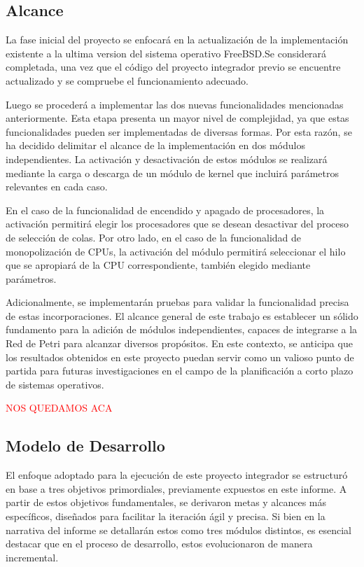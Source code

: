 \subsection{Alcance}

La fase inicial del proyecto se enfocará en la actualización de la implementación existente a la ultima version del sistema operativo FreeBSD.\@ Se considerará completada, una vez que el código del proyecto integrador previo se encuentre actualizado y se compruebe el funcionamiento adecuado.\par

Luego se procederá a implementar las dos nuevas funcionalidades mencionadas anteriormente. Esta etapa presenta un mayor nivel de complejidad, ya que estas funcionalidades pueden ser implementadas de diversas formas. Por esta razón, se ha decidido delimitar el alcance de la implementación en dos módulos independientes. La activación y desactivación de estos módulos se realizará mediante la carga o descarga de un módulo de kernel que incluirá parámetros relevantes en cada caso.\par

En el caso de la funcionalidad de encendido y apagado de procesadores, la activación permitirá elegir los procesadores que se desean desactivar del proceso de selección de colas. Por otro lado, en el caso de la funcionalidad de monopolización de CPUs, la activación del módulo permitirá seleccionar el hilo que se apropiará de la CPU correspondiente, también elegido mediante parámetros.\par

Adicionalmente, se implementarán pruebas para validar la funcionalidad precisa de estas incorporaciones. El alcance general de este trabajo es establecer un sólido fundamento para la adición de módulos independientes, capaces de integrarse a la Red de Petri para alcanzar diversos propósitos. En este contexto, se anticipa que los resultados obtenidos en este proyecto puedan servir como un valioso punto de partida para futuras investigaciones en el campo de la planificación a corto plazo de sistemas operativos.\par

\textcolor{red}{NOS QUEDAMOS ACA}

\subsection{Modelo de Desarrollo}
El enfoque adoptado para la ejecución de este proyecto integrador se estructuró en base a tres objetivos primordiales, previamente expuestos en este informe. A partir de estos objetivos fundamentales, se derivaron metas y alcances más específicos, diseñados para facilitar la iteración ágil y precisa. Si bien en la narrativa del informe se detallarán estos como tres módulos distintos, es esencial destacar que en el proceso de desarrollo, estos evolucionaron de manera incremental.



